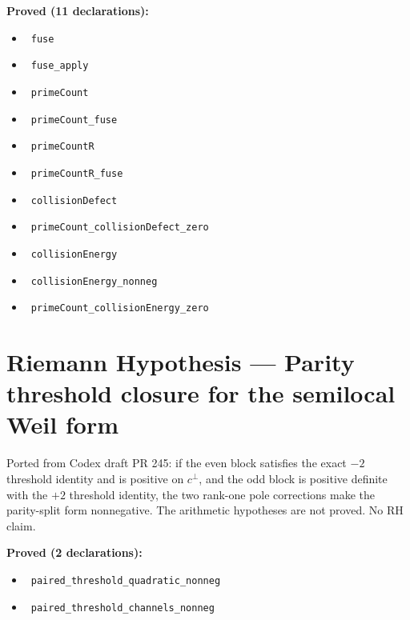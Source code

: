 \documentclass{report}
\theoremstyle{definition}
\begin{document}
\noindent\textbf{Proved (11 declarations):}
\begin{itemize}
  \item {}\leanok\ \texttt{fuse}
  \item {}\leanok\ \texttt{fuse\_apply}
  \item {}\leanok\ \texttt{primeCount}
  \item {}\leanok\ \texttt{primeCount\_fuse}
  \item {}\leanok\ \texttt{primeCountR}
  \item {}\leanok\ \texttt{primeCountR\_fuse}
  \item {}\leanok\ \texttt{collisionDefect}
  \item {}\leanok\ \texttt{primeCount\_collisionDefect\_zero}
  \item {}\leanok\ \texttt{collisionEnergy}
  \item {}\leanok\ \texttt{collisionEnergy\_nonneg}
  \item {}\leanok\ \texttt{primeCount\_collisionEnergy\_zero}
\end{itemize}

\section{Riemann Hypothesis --- Parity threshold closure for the semilocal Weil form}
Ported from Codex draft PR 245: if the even block satisfies the exact $-2$ threshold identity and is positive on $c^\perp$, and the odd block is positive definite with the $+2$ threshold identity, the two rank-one pole corrections make the parity-split form nonnegative. The arithmetic hypotheses are not proved. No RH claim.

\noindent\textbf{Proved (2 declarations):}
\begin{itemize}
  \item {}\leanok\ \texttt{paired\_threshold\_quadratic\_nonneg}
  \item {}\leanok\ \texttt{paired\_threshold\_channels\_nonneg}
\end{itemize}
\end{document}

